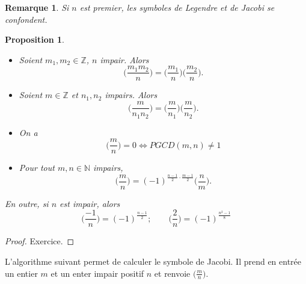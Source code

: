 \documentclass[10pt,a4paper]{report}
\newtheorem*{rem}{Remarque}
\newtheorem{Prop}[thm]{Proposition}
\begin{document}
\begin{rem}
Si $n$ est premier, les symboles de Legendre et de Jacobi se confondent.
\end{rem}

\begin{Prop}\
\begin{itemize}
\item[$1)$] Soient $m_1,m_2 \in \mathbb{Z}$, $n$ impair. Alors $$\Big(  \frac{m_1 m_2}{n}\Big)= \Big(  \frac{m_1}{n}\Big) \Big(  \frac{m_2}{n}\Big). $$
\item[$2)$] Soient $m \in \mathbb{Z}$ et $n_1,n_2$ impairs. Alors 
$$    \Big(  \frac{m}{n_1 n_2}\Big)= \Big(  \frac{m}{n_1}\Big)\Big(  \frac{m}{n_2}\Big) .  $$
\item[$3)$] On a
$$     \Big(  \frac{m}{n}\Big)=0 \Longleftrightarrow PGCD(m,n) \neq 1    $$
\item[$4)$] Pour tout $m,n \in \mathbb{N}$ impairs, 
$$   \Big(  \frac{m}{n}\Big)= (-1)^{\tfrac{n-1}{2}\cdot \tfrac{m-1}{2} } \Big(  \frac{n}{m}\Big) .   $$
\end{itemize}
En outre, si $n$ est impair, alors 
$$   \Big(  \frac{-1}{n}\Big)= (-1)^{\tfrac{n-1}{2}} ; \qquad  \Big(  \frac{2}{n}\Big)= (-1)^{\tfrac{n^2-1}{8}}  $$    
\end{Prop}

\begin{proof}
Exercice.
\end{proof}


L'algorithme suivant permet de calculer le symbole de Jacobi. Il prend en entrée un entier $m$ et un enter impair positif $n$ et renvoie $ \big( \tfrac{m}{n} \big)$.\\
\end{document}
